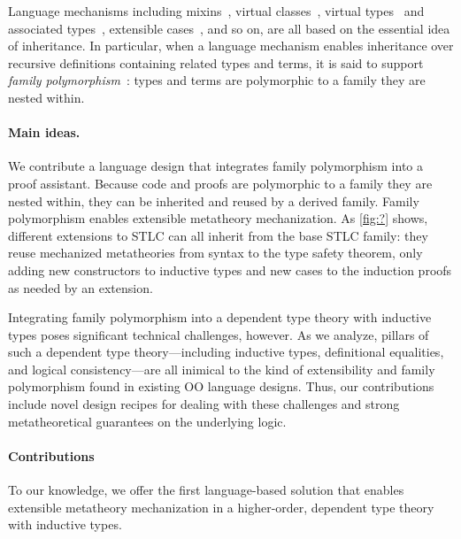 Language mechanisms including
mixins~\cite{mixin-1990},
virtual classes~\cite{virtualclasses-1989,vc-calculus-2006},
virtual types~\cite{thorup97} and associated types~\cite{ckj05},
extensible cases~\cite{bac2006},
and so on, are all based on the essential idea of inheritance.
%
In particular, when a language mechanism enables inheritance over
recursive definitions containing related types and terms,
it is said to support \emph{family polymorphism}~\cite{ernst2001family}:
types and terms are polymorphic to a family they are nested within.

\paragraph{Main ideas.}

We contribute a language design that integrates family polymorphism into
a proof assistant.
Because code and proofs are polymorphic to a family they are nested
within, they can be inherited and reused by a derived family.
%
Family polymorphism enables extensible metatheory mechanization.
As \cref{fig:?} shows,
different extensions to STLC can all inherit from the base STLC family:
they reuse mechanized metatheories from syntax to the type safety
theorem, only adding new constructors to inductive types
and new cases to the induction proofs as needed by an extension.

Integrating family polymorphism into a dependent type theory with
inductive types poses significant technical challenges, however.
As we analyze, pillars of such a dependent type theory—including
inductive types, definitional equalities, and logical consistency—are
all inimical to the kind of extensibility and family polymorphism
found in existing OO language designs.
Thus, our contributions include novel design recipes for dealing with
these challenges and strong meta\-theoretical guarantees on the
underlying logic.

\paragraph{Contributions} To our knowledge, we offer the first
language-based solution that enables extensible metatheory mechanization
in a higher-order, dependent type theory with inductive types.

